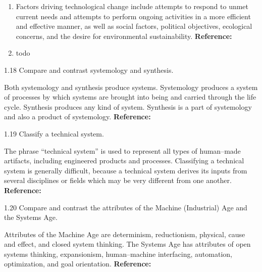 \begin{exsol@solution}{}
        \begin{enumerate}[label=\alph*)]
            \item Factors driving technological change include attempts to respond to unmet current needs and attempts to perform ongoing activities in a more efficient and effective manner, as well as social factors, political objectives, ecological concerns, and the desire for environmental sustainability. \textbf{Reference:}
            \item todo
        \end{enumerate}
\end{exsol@solution}
\begin{exsol@exercise}{1.18}
    \label{sea-1-23}
        Compare and contrast systemology and synthesis.
\end{exsol@exercise}
\begin{exsol@solution}{}
        Both systemology and synthesis produce systems. Systemology produces a system of processes by which systems are brought into being and carried through the life cycle. Synthesis produces any kind of system. Synthesis is a part of systemology and also a product of systemology. \textbf{Reference:}
\end{exsol@solution}
\begin{exsol@exercise}{1.19}
    \label{sea-1-24}
        Classify a technical system.
\end{exsol@exercise}
\begin{exsol@solution}{}
        The phrase “technical system” is used to represent all types of human–made artifacts, including engineered products and processes. Classifying a technical system is generally difficult, because a technical system derives its inputs from several disciplines or fields which may be very different from one another. \textbf{Reference:}
\end{exsol@solution}
\begin{exsol@exercise}{1.20}
    \label{sea-1-27}
        Compare and contrast the attributes of the Machine (Industrial) Age and the Systems Age.
\end{exsol@exercise}
\begin{exsol@solution}{}
        Attributes of the Machine Age are determinism, reductionism, physical, cause and effect, and closed system thinking. The Systems Age has attributes of open systems thinking, expansionism, human–machine interfacing, automation, optimization, and goal orientation. \textbf{Reference:}
\end{exsol@solution}
